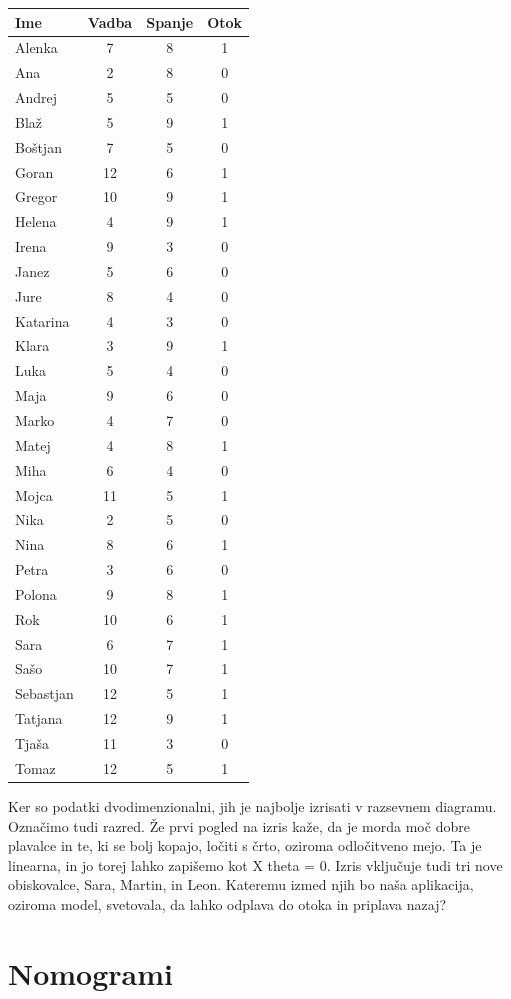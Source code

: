 \begin{marginfigure}
\footnotesize
\centering
\begin{tabular}{lccc}
\toprule
Ime & Vadba & Spanje & Otok \\
\midrule
Alenka     & 7  & 8 & 1 \\
Ana        & 2  & 8 & 0 \\
Andrej     & 5  & 5 & 0 \\
Blaž       & 5  & 9 & 1 \\
Boštjan    & 7  & 5 & 0 \\
Goran      & 12 & 6 & 1 \\
Gregor     & 10 & 9 & 1 \\
Helena     & 4  & 9 & 1 \\
Irena      & 9  & 3 & 0 \\
Janez      & 5  & 6 & 0 \\
Jure       & 8  & 4 & 0 \\
Katarina   & 4  & 3 & 0 \\
Klara      & 3  & 9 & 1 \\
Luka       & 5  & 4 & 0 \\
Maja       & 9  & 6 & 0 \\
Marko      & 4  & 7 & 0 \\
Matej      & 4  & 8 & 1 \\
Miha       & 6  & 4 & 0 \\
Mojca      & 11 & 5 & 1 \\
Nika       & 2  & 5 & 0 \\
Nina       & 8  & 6 & 1 \\
Petra      & 3  & 6 & 0 \\
Polona     & 9  & 8 & 1 \\
Rok        & 10 & 6 & 1 \\
Sara       & 6  & 7 & 1 \\
Sašo       & 10 & 7 & 1 \\
Sebastjan  & 12 & 5 & 1 \\
Tatjana    & 12 & 9 & 1 \\
Tjaša      & 11 & 3 & 0 \\
Tomaz      & 12 & 5 & 1 \\
\bottomrule
\end{tabular}
\end{marginfigure}

Ker so podatki dvodimenzionalni, jih je najbolje izrisati v razsevnem diagramu. Označimo tudi razred. Že prvi pogled na izris kaže, da je morda moč dobre plavalce in te, ki se bolj kopajo, ločiti s črto, oziroma odločitveno mejo. Ta je linearna, in jo torej lahko zapišemo kot X theta = 0. Izris vključuje tudi tri nove obiskovalce, Sara, Martin, in Leon. Kateremu izmed njih bo naša aplikacija, oziroma model, svetovala, da lahko odplava do otoka in priplava nazaj?






\section{Nomogrami}
